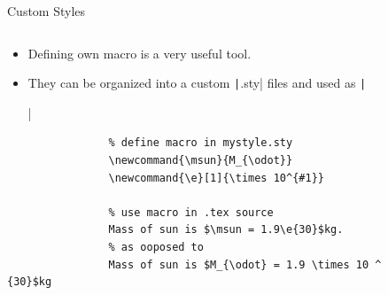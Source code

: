 \documentclass[aspectratio=169]{beamer}
\newcommand{\code}[2][python]{\texttt|#2|}
\begin{document}
\begin{frame}[fragile]{Custom Styles}
    \begin{columns}
        \begin{column}{0.39\textwidth}
            \begin{itemize}
                \item<1-> Defining own macro is a very useful tool.
                \item<1-> They can be organized into a custom \code{.sty} files and used as \texttt|\usepackage{mystyle.sty}|
            \end{itemize}
            \begin{verbatim}
                % define macro in mystyle.sty
                \newcommand{\msun}{M_{\odot}}
                \newcommand{\e}[1]{\times 10^{#1}}

                % use macro in .tex source 
                Mass of sun is $\msun = 1.9\e{30}$kg.
                % as ooposed to
                Mass of sun is $M_{\odot} = 1.9 \times 10 ^ {30}$kg
            \end{verbatim}
        \end{column}
        \begin{column}{0.59\textwidth}
            \begin{columns}
                \begin{column}{0.49\textwidth}
                \end{column}
                \begin{column}{0.49\textwidth}
                \end{column}
            \end{columns}
        \end{column}
    \end{columns}
\end{frame} 
%
%
%
\end{document}
